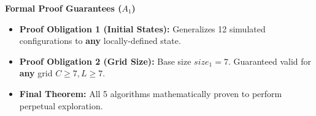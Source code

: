 \begin{frame}{}

\textbf{Formal Proof Guarantees ($A_1$)}
\vspace{0.4cm}
\begin{itemize}\setlength\itemsep{0.4cm}
    \item<1-> \textbf{Proof Obligation 1 (Initial States):}
          \newline \textcolor{softgray}{\small Generalizes 12 simulated configurations to \textbf{any} locally-defined state.}
          
    \item<2-> \textbf{Proof Obligation 2 (Grid Size):}
          \newline \textcolor{softgray}{\small Base size $size_1 = 7$. Guaranteed valid for \textbf{any} grid $C \ge 7, L \ge 7$.}
          
    \item<3-> \textcolor{accent}{\textbf{Final Theorem:}} 
          \newline \textcolor{softgray}{\small All 5 algorithms mathematically proven to perform perpetual exploration.}
\end{itemize}

\end{frame}
